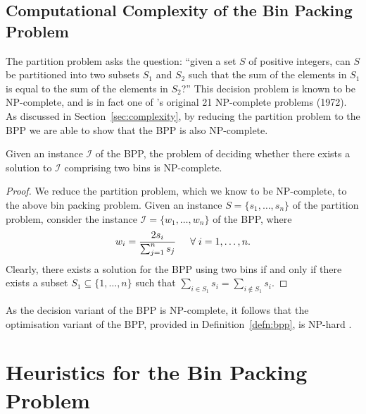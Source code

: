 \documentclass[a4paper,11pt]{article}
\begin{document}
\subsection{Computational Complexity of the Bin Packing Problem}
\label{sub:complexitybpp}

\noindent The partition problem asks the question: ``given a set $S$ of positive integers, can $S$ be partitioned into two subsets $S_1$ and $S_2$ such that the sum of the elements in $S_1$ is equal to the sum of the elements in $S_2$?'' This decision problem is known to be NP-complete, and is in fact one of \citeauthor{karp1972}'s original 21 NP-complete problems (1972). As discussed in Section~\ref{sec:complexity}, by reducing the partition problem to the BPP we are able to show that the BPP is also NP-complete.

\begin{theorem}
	Given an instance $\mathcal{I}$ of the BPP, the problem of deciding whether there exists a solution to $\mathcal{I}$ comprising two bins is NP-complete.
	\label{thm:bppnpcomplete}
\end{theorem}

\begin{proof}
	We reduce the partition problem, which we know to be NP-complete, to the above bin packing problem. Given an instance $S = \{s_1,\dotsc,s_n\}$ of the partition problem, consider the instance $\mathcal{I} = \{w_1,\dotsc,w_n\}$ of the BPP, where
	\[
	w_i = \frac{2s_i}{\sum_{j=1}^n s_j} \hspace{5mm} \forall \hspace{1mm} i = 1,\dotsc,n.
	\]
	Clearly, there exists a solution for the BPP using two bins if and only if there exists a subset $S_1 \subseteq \{1,\dotsc,n\}$ such that $\sum_{i\in S_1} s_i = \sum_{i \notin S_1} s_i$.
\end{proof}		

\noindent As the decision variant of the BPP is NP-complete, it follows that the optimisation variant of the BPP, provided in Definition~\ref{defn:bpp}, is NP-hard \citep{garey1978,garey1979}.



\section{Heuristics for the Bin Packing Problem}
\label{sec:heurbpp}
\end{document}
